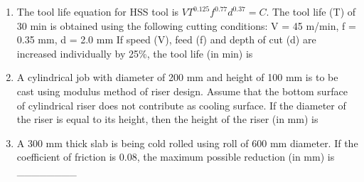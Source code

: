 \documentclass[journal,11pt,onecolumn]{IEEEtran}
\begin{document}
\begin{enumerate}[resume]
    \item The tool life equation for HSS tool is $VT^{0.125}f^{0.77}d^{0.37} = C$. The tool life (T) of 30 min is obtained using the following cutting conditions:
          V = 45 m/min, f = 0.35 mm, d = 2.0 mm
          If speed (V), feed (f) and depth of cut (d) are increased individually by 25\%, the tool life (in min) is

          \begin{enumerate}


          \end{enumerate}

    \item A cylindrical job with diameter of 200 mm and height of 100 mm is to be cast using modulus method of riser design. Assume that the bottom surface of cylindrical riser does not contribute as cooling surface. If the diameter of the riser is equal to its height, then the height of the riser (in mm) is

          \begin{enumerate}


          \end{enumerate}

    \item A 300 mm thick slab is being cold rolled using roll of 600 mm diameter. If the coefficient of friction is 0.08, the maximum possible reduction (in mm) is \_\_\_\_\_\_\_\_


\end{enumerate}
\end{document}
